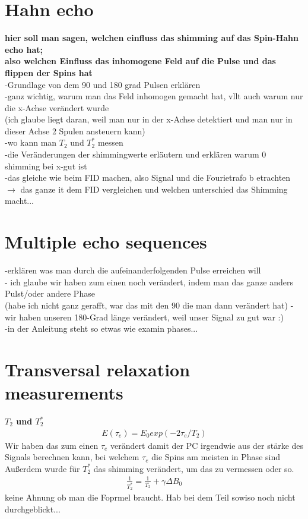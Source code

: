 \section{Hahn echo}
    \textbf{hier soll man sagen, welchen einfluss das shimming auf das Spin-Hahn echo hat;\\
    also welchen Einfluss das inhomogene Feld auf die Pulse und das flippen der Spins hat}\\
    -Grundlage von dem 90 und 180 grad Pulsen erklären\\
    -ganz wichtig, warum man das Feld inhomogen gemacht hat, vllt auch warum nur die x-Achse verändert wurde\\
    (ich glaube liegt daran, weil man nur in der x-Achse detektiert und man nur in dieser Achse 2 Spulen ansteuern kann)\\
    -wo kann man $T_2$ und $T_2^{\ast}$ messen\\
    -die Veränderungen der shimmingwerte erläutern und erklären warum 0 shimming bei x-gut ist
    \\
    -das gleiche wie beim FID machen, also Signal und die Fourietrafo b etrachten\\
    $\rightarrow$ das ganze  it dem FID vergleichen und welchen unterschied das Shimming macht...

\section{Multiple echo sequences}
    -erklären was man durch die aufeinanderfolgenden Pulse erreichen will\\
    - ich glaube wir haben zum einen noch verändert, indem man das ganze anders Pulst/oder andere Phase\\
    (habe ich nicht ganz gerafft, war das mit den 90 die man dann verändert hat)
    - wir haben unseren 180-Grad länge verändert, weil unser Signal zu gut war :) \smiley{}\\
    -in der Anleitung steht so etwas wie examin phases...
\section{Transversal relaxation measurements}
    \textbf{$T_2$ und $T_2^{\ast}$}
    \begin{align}
        E(\tau_e)=E_0exp(-2\tau_e/T_2)
    \end{align}
    Wir haben das zum einen $\tau_e$ verändert damit der PC irgendwie aus der stärke des Signals berechnen kann, bei welchem $\tau_e$ die Spins am meisten in Phase sind\\
    Außerdem wurde für $T_2^{\ast}$ das shimming verändert, um das zu vermessen oder so.
    \begin{align}
        \frac{1}{T_2^{\ast}}=\frac{1}{T_2}+\gamma \Delta B_0
    \end{align}
    keine Ahnung ob man die Foprmel braucht. Hab bei dem Teil sowiso noch nicht durchgeblickt...



